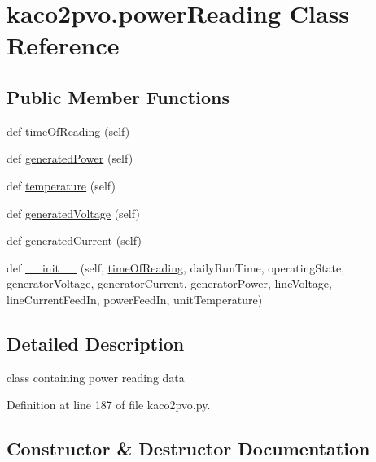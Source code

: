 \hypertarget{classkaco2pvo_1_1power_reading}{}\section{kaco2pvo.\+power\+Reading Class Reference}
\label{classkaco2pvo_1_1power_reading}
\subsection*{Public Member Functions}
\begin{DoxyCompactItemize}
\item 
def \hyperlink{classkaco2pvo_1_1power_reading_ad4ef9e10f6fe52b831e77bfec01e5631}{time\+Of\+Reading} (self)
\item 
def \hyperlink{classkaco2pvo_1_1power_reading_a66c31bdc9b5d8394a1a7c401a4a3b8cc}{generated\+Power} (self)
\item 
def \hyperlink{classkaco2pvo_1_1power_reading_a5b5cb46554a0ce2272a8fd74c1f6da30}{temperature} (self)
\item 
def \hyperlink{classkaco2pvo_1_1power_reading_ac52a4bb391a4514eda0adc4fd4c6812f}{generated\+Voltage} (self)
\item 
def \hyperlink{classkaco2pvo_1_1power_reading_ac95389457ebe2e76da8ee7301de07b44}{generated\+Current} (self)
\item 
def \hyperlink{classkaco2pvo_1_1power_reading_a0fdcffd3cc4ba4f83d8a26d7ca1b58be}{\+\_\+\+\_\+init\+\_\+\+\_\+} (self, \hyperlink{classkaco2pvo_1_1power_reading_ad4ef9e10f6fe52b831e77bfec01e5631}{time\+Of\+Reading}, daily\+Run\+Time, operating\+State, generator\+Voltage, generator\+Current, generator\+Power, line\+Voltage, line\+Current\+Feed\+In, power\+Feed\+In, unit\+Temperature)
\end{DoxyCompactItemize}


\subsection{Detailed Description}
\begin{DoxyVerb}class containing power reading data \end{DoxyVerb}
 

Definition at line 187 of file kaco2pvo.\+py.



\subsection{Constructor \& Destructor Documentation}
\hypertarget{classkaco2pvo_1_1power_reading_a0fdcffd3cc4ba4f83d8a26d7ca1b58be}{}
